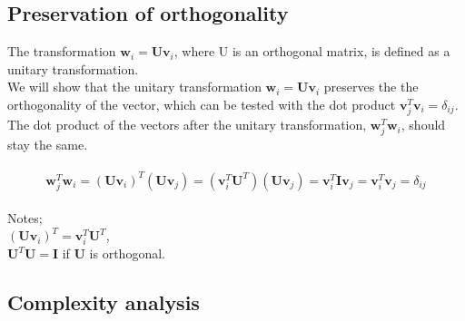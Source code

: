 \documentclass[a4paper]{article}
\begin{document}
\subsection{Preservation of orthogonality}

The transformation $\textbf{w}_i = \textbf{U}\textbf{v}_i$, where U is an orthogonal matrix, is defined as a unitary transformation.
\\
We will show that the unitary transformation $\textbf{w}_i = \textbf{U}\textbf{v}_i$ preserves the the orthogonality of the vector, which can be tested with the dot product $\textbf{v}_j^T\textbf{v}_i = \delta_{ij}$. The dot product of the vectors after the unitary transformation, $\textbf{w}_j^T\textbf{w}_i$, should stay the same.\\
\\
\begin{equation}
\textbf{w}_j^T\textbf{w}_i = (\textbf{U}\textbf{v}_i)^T(\textbf{U}\textbf{v}_j) = (\textbf{v}_i^T\textbf{U}^T)(\textbf{U}\textbf{v}_j) = \textbf{v}_i^T\textbf{I}\textbf{v}_j = \textbf{v}_i^T\textbf{v}_j = \delta_{ij}
\end{equation}
\\
Notes;\\
$(\textbf{U}\textbf{v}_i)^T = \textbf{v}_i^T\textbf{U}^T$,\\
$\textbf{U}^T\textbf{U} = \textbf{I}$ if $\textbf{U}$ is orthogonal.

\subsection{Complexity analysis}
\end{document}
